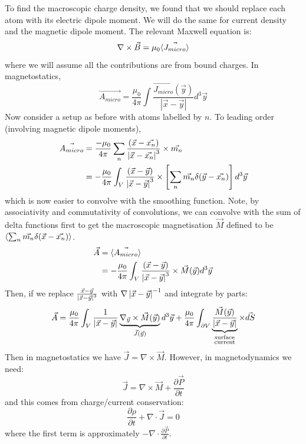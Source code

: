 \documentclass[../Main.tex]{subfiles}
\begin{document}
To find the macroscopic charge density, we found that we should replace each atom with its electric dipole moment. We will do the same for current density and the magnetic dipole moment. The relevant Maxwell equation is:
\begin{equation*}
    \nabla \times \vec{B} = \mu_0 \langle\vec{J_{micro}}\rangle
\end{equation*}
where we will assume all the contributions are from bound charges. In magnetostatics,
\begin{equation*}
    \vec{A_{micro}} = \frac{\mu_0}{4\pi} \int \frac{\vec{J_{micro}}(\vec y)}{|\vec x - \vec y|} d^3\vec y
\end{equation*}
Now consider a setup as before with atoms labelled by $n$. To leading order (involving magnetic dipole moments),
\begin{align*}
    \vec{A_{micro}} &= \frac{-\mu_0}{4\pi} \sum_n \frac{(\vec x - \vec{x_n})}{\left|\vec x - \vec{x_n}\right|^3} \times \vec{m_n} \\
    &= -\frac{\mu_0}{4\pi} \int_V \frac{(\vec x - \vec y)}{\left|\vec x - \vec y\right|^3} \times \left[\sum_n \vec{m_n} \delta(\vec y - \vec{x_n})\right]d^3\vec{y}
\end{align*}
which is now easier to convolve with the smoothing function. Note, by associativity and commutativity of convolutions, we can convolve with the sum of delta functions first to get the macroscopic magnetisation $\vec{M}$ defined to be $\langle\sum_n \vec{m_n} \delta(\vec{x} - \vec{x_n})\rangle$.
\begin{align*}
    \vec{A} &= \langle\vec{A_{micro}}\rangle \\
    &= -\frac{\mu_0}{4\pi} \int_V \frac{(\vec x - \vec y)}{\left|\vec x - \vec y\right|^3} \times \vec{M}(\vec y) d^3\vec{y}
\end{align*}
Then, if we replace $\frac{\vec x - \vec y}{\left|\vec x - \vec y\right|^3}$ with $\nabla \left|\vec x - \vec y\right|^{-1}$ and integrate by parts:
\begin{equation*}
   \vec A = \frac{\mu_0}{4\pi} \int_V \frac{1}{\left|\vec x - \vec y\right|} \underbrace{\nabla_{\vec y} \times \vec M(\vec y)}_{\vec J(\vec y)}d^3\vec y + \frac{\mu_0}{4\pi} \int_{\partial V} \underbrace{\frac{\vec{M}(\vec y)}{\left|\vec x - \vec y\right|}}_{\substack{\text{surface}\\\text{current}}} \times \vec{dS}
\end{equation*}
Then in magnetostatics we have $\vec J = \nabla \times \vec{M}$. However, in magnetodynamics we need:
\begin{equation*}
    \vec J = \nabla \times \vec{M} + \frac{\partial \vec P}{\partial t}
\end{equation*}
and this comes from charge/current conservation:
\begin{equation*}
    \frac{\partial \rho}{\partial t} + \nabla \cdot \vec{J} = 0
\end{equation*}
where the first term is approximately $-\nabla \cdot \frac{\partial \vec P}{\partial t}$.
\end{document}
